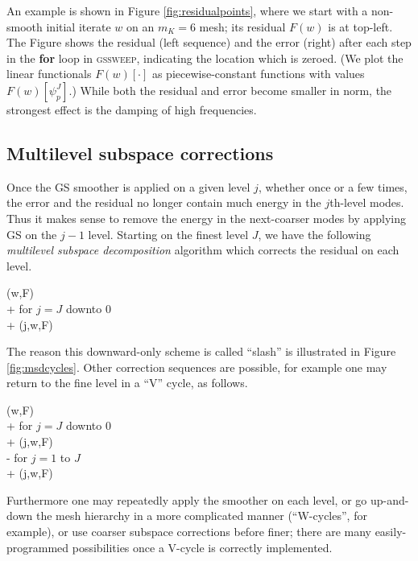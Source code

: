 \documentclass[letterpaper,final,12pt,reqno]{amsart}
\theoremstyle{claim}
\numberwithin{equation}{section}
\numberwithin{figure}{section}
\numberwithin{table}{section}
\numberwithin{theorem}{section}
\begin{document}
An example is shown in Figure \ref{fig:residualpoints}, where we start with a non-smooth initial iterate $w$ on an $m_K=6$ mesh; its residual $F(w)$ is at top-left.  The Figure shows the residual (left sequence) and the error (right) after each step in the \textbf{for} loop in \textsc{gssweep}, indicating the location which is zeroed.  (We plot the linear functionals $F(w)[\cdot]$ as piecewise-constant functions with values $F(w)[\psi_p^J]$.)  While both the residual and error become smaller in norm, the strongest effect is the damping of high frequencies.

\subsection*{Multilevel subspace corrections}  Once the GS smoother is applied on a given level $j$, whether once or a few times, the error and the residual no longer contain much energy in the $j$th-level modes.  Thus it makes sense to remove the energy in the next-coarser modes by applying GS on the $j-1$ level.  Starting on the finest level $J$, we have the following \emph{multilevel subspace decomposition} algorithm which corrects the residual on each level.
\begin{pseudo*}
(w,F)\text{:} \\+
    for $j=J$ downto $0$ \\+
        (j,w,F)
\end{pseudo*}

The reason this downward-only scheme is called ``slash'' is illustrated in Figure \ref{fig:msdcycles}.  Other correction sequences are possible, for example one may return to the fine level in a ``V'' cycle, as follows.
\begin{pseudo*}
(w,F)\text{:} \\+
    for $j=J$ downto $0$ \\+
        (j,w,F) \\-
    for $j=1$ to $J$ \\+
        (j,w,F)
\end{pseudo*}
Furthermore one may repeatedly apply the smoother on each level, or go up-and-down the mesh hierarchy in a more complicated manner (``W-cycles'', for example), or use coarser subspace corrections before finer; there are many easily-programmed possibilities \cite{Briggsetal2000,Trottenbergetal2001} once a V-cycle is correctly implemented.
\end{document}
